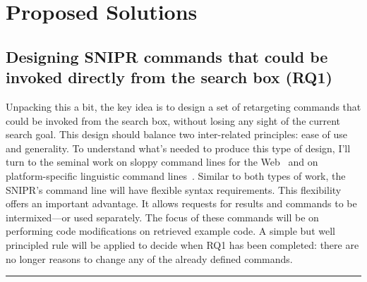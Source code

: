 \chapter{Proposed Solutions}{}
\label{sec:solutions}

\section{Designing \uppercase{SnipR} commands that could be invoked directly from the search box (RQ1)}
\label{sec:rq1}
Unpacking this a bit, the key idea is to design a set of retargeting commands that could be invoked from the search box, without losing any sight of the current search goal. This design should balance two inter-related principles: ease of use and generality. To understand what's needed to produce this type of design, I'll turn to the seminal work on sloppy command lines for the Web~\cite{Little:2007dh, Miller:2008ge} and on platform-specific linguistic command lines~\cite{Raskin:2008wb}. Similar to both types of work, the \uppercase{SnipR}'s command line will have flexible syntax requirements. This flexibility offers an important advantage. It allows requests for results and commands to be intermixed---or used separately. The focus of these commands will be on performing code modifications on retrieved example code. A simple but well principled rule will be applied to decide when RQ1 has been completed: there are no longer reasons to change any of the already defined commands. 

\fancybreak{\pfbreakdisplay}

